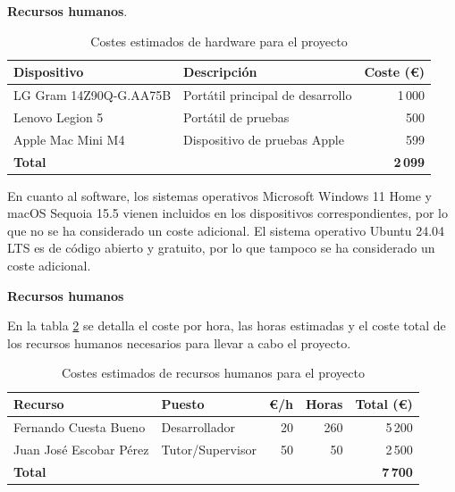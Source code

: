\textbf{Recursos humanos}.

\begin{table}[!ht]
      \centering
      \begin{tabular}{|l|l|r|}
            \hline
            \textbf{Dispositivo}   & \textbf{Descripción}             & \textbf{Coste (€)} \\
            \hline
            LG Gram 14Z90Q-G.AA75B & Portátil principal de desarrollo & 1\,000             \\
            Lenovo Legion 5        & Portátil de pruebas              & 500                \\
            Apple Mac Mini M4      & Dispositivo de pruebas Apple     & 599                \\
            \hline
            \textbf{Total}         &                                  & \textbf{2\,099}    \\
            \hline
      \end{tabular}
      \caption{Costes estimados de hardware para el proyecto}
      \label{tab:costes-hardware}
\end{table}

En cuanto al software, los sistemas operativos Microsoft Windows 11 Home y macOS Sequoia 15.5 vienen incluidos en los dispositivos correspondientes, por lo que no se ha considerado un coste adicional. El sistema operativo Ubuntu 24.04 LTS es de código abierto y gratuito, por lo que tampoco se ha considerado un coste adicional.

\textbf{Recursos humanos}

En la tabla \ref{tab:recursos-humanos} se detalla el coste por hora, las horas estimadas y el coste total de los recursos humanos necesarios para llevar a cabo el proyecto.

\begin{table}[!ht]
      \centering
      \begin{tabular}{|l|l|r|r|r|}
            \hline
            \textbf{Recurso}        & \textbf{Puesto}  & \textbf{€/h} & \textbf{Horas} & \textbf{Total (€)} \\
            \hline
            Fernando Cuesta Bueno   & Desarrollador    & 20           & 260            & 5\,200             \\
            Juan José Escobar Pérez & Tutor/Supervisor & 50           & 50             & 2\,500             \\
            \hline
            \textbf{Total}          &                  &              &                & \textbf{7\,700}    \\
            \hline
      \end{tabular}
      \caption{Costes estimados de recursos humanos para el proyecto}
      \label{tab:recursos-humanos}
\end{table}

